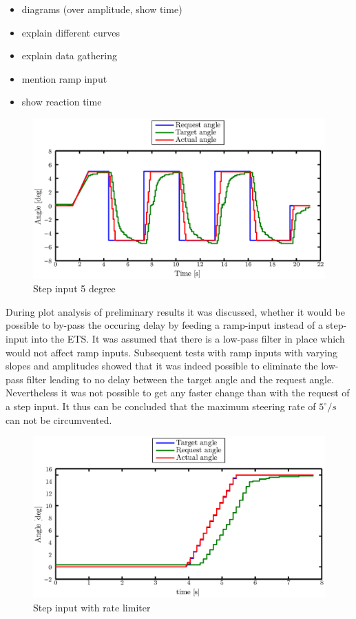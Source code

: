\documentclass[ExampleMasters.tex]{subfiles}
\begin{document}
\begin{itemize}
	\item diagrams (over amplitude, show time)
	\item explain different curves
	\item explain data gathering
	\item mention ramp input 
	\item show reaction time
\end{itemize}
\begin{figure}[!hbt]
	\centering
	\includegraphics[width=1\linewidth]{figures/lifted_front_5deg}
	\caption{Step input 5 degree}
	
	\label{fig:step_input}
\end{figure}
During plot analysis of preliminary results it was discussed, whether it would be possible to by-pass the occuring delay by feeding a ramp-input instead of a step-input into the \gls{ETS}. It was assumed that there is a low-pass filter in place which would not affect ramp inputs. Subsequent tests with ramp inputs with varying slopes and amplitudes showed that it was indeed possible to eliminate the low-pass filter leading to no delay between the target angle and the request angle. Nevertheless it was not possible to get any faster change than with the request of a step input. It thus can be concluded that the maximum steering rate of $5 ^\circ /s$ can not be circumvented.
\begin{figure}[!hbt]
	\centering
	\includegraphics[width=1\linewidth]{figures/rate_limiter1}
	\caption{Step input with rate limiter}
	
	\label{fig:rate_limiter1}
\end{figure}
\end{document}
